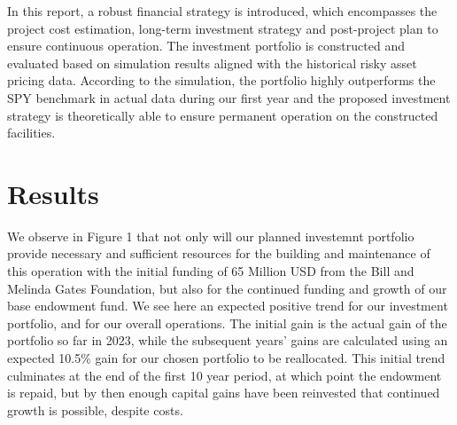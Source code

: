 \documentclass[10pt,twocolumn,twoside,final]{IEEEtran}
\begin{document}
In this report, a robust financial strategy is introduced, which encompasses the project cost estimation, long-term investment strategy and post-project plan to ensure continuous operation. The investment portfolio is constructed and evaluated based on simulation results aligned with the historical risky asset pricing data. According to the simulation, the portfolio highly outperforms the SPY benchmark in actual data during our first year and the proposed investment strategy is theoretically able to ensure permanent operation on the constructed facilities.


\section{Results}

We observe in Figure 1 that not only will our planned investemnt portfolio provide necessary and sufficient resources for the building and maintenance of this operation with the initial funding of 65 Million USD from the Bill and Melinda Gates Foundation, but also for the continued funding and growth of our base endowment fund. We see here an expected positive trend for our investment portfolio, and for our overall operations. The initial gain is the actual gain of the portfolio so far in 2023, while the subsequent years' gains are calculated using an expected 10.5\% gain for our chosen portfolio to be reallocated. This initial trend culminates at the end of the first 10 year period, at which point the endowment is repaid, but by then enough capital gains have been reinvested that continued growth is possible, despite costs.
\end{document}
